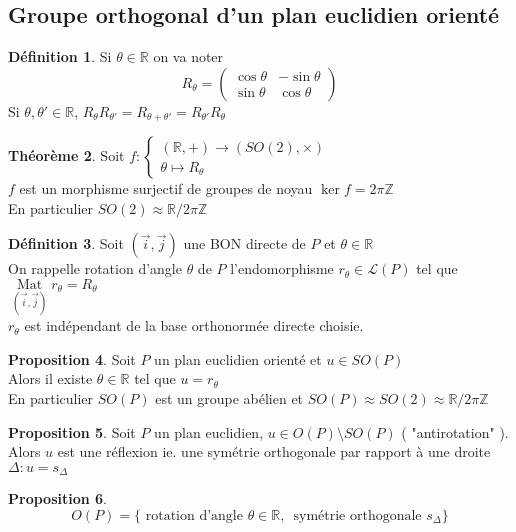 \documentclass[10pt,a4paper]{article}
\theoremstyle{definition}
\newtheorem{proposition}{Proposition}[section]
\newtheorem{theorem}[proposition]{Théorème}
\newtheorem{definition}[proposition]{Définition}
\DeclareMathOperator*{\mat}{Mat}
\begin{document}
\subsection{Groupe orthogonal d'un plan euclidien orienté}
\begin{definition}
    Si \(\theta \in \mathbb{R}\) on va noter 
    \[R_\theta = \begin{pmatrix}
        \cos \theta & - \sin \theta \\
        \sin \theta & \cos \theta
    \end{pmatrix}\]
    Si \(\theta, \theta' \in \mathbb{R}\), \(R_\theta R_{\theta'} = R_{\theta + \theta'} = R_{\theta'}R_\theta\)
\end{definition}
\begin{theorem}
    Soit \(f: \begin{cases}
        (\mathbb{R}, +) \to (SO(2), \times) \\
        \theta \mapsto R_\theta
    \end{cases}\) \\
    \(f\) est un morphisme surjectif de groupes de noyau \(\ker f = 2 \pi \mathbb{Z}\) \\
    En particulier \(SO(2) \approx \mathbb{R} / 2 \pi \mathbb{Z} \)
\end{theorem}
\begin{definition}
    Soit \((\vec{i}, \vec{j})\) une BON directe de \(P\) et \(\theta \in \mathbb{R}\) \\
    On rappelle rotation d'angle \(\theta\) de \(P\) l'endomorphisme \(r_\theta \in \mathcal{L}(P)\) tel que \(\mat\limits_{(\vec{i}, \vec{j})} r_\theta = R_\theta\) \\
    \(r_\theta\) est indépendant de la base orthonormée directe choisie.
\end{definition}
\begin{proposition}
    Soit \(P\) un plan euclidien orienté et \(u \in SO(P)\) \\
    Alors il existe \(\theta \in \mathbb{R}\) tel que \(u = r_\theta\) \\
    En particulier \(SO(P)\) est un groupe abélien et \(SO(P) \approx SO(2) \approx \mathbb{R} / 2 \pi \mathbb{Z}\)
\end{proposition}
\begin{proposition}
    Soit \(P\) un plan euclidien, \(u \in O(P) \setminus SO(P)\) ( "antirotation" ). \\
    Alors \(u\) est une réflexion ie. une symétrie orthogonale par rapport à une droite \(\Delta : u = s_\Delta\)
\end{proposition}
\begin{proposition}
    \[\boxed{O(P) = \{ \text{ rotation d'angle } \theta \in \mathbb{R},\, \text{ symétrie orthogonale } s_\Delta\}}\]
\end{proposition}
\end{document}
